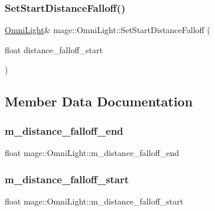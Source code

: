 \hypertarget{classmage_1_1_omni_light_a3d8adcbc2e6c712eae738ddfd47454f6}{}\label{classmage_1_1_omni_light_a3d8adcbc2e6c712eae738ddfd47454f6} 
\subsubsection{\texorpdfstring{Set\+Start\+Distance\+Falloff()}{SetStartDistanceFalloff()}}
{\footnotesize\ttfamily \hyperlink{classmage_1_1_omni_light}{Omni\+Light}\& mage\+::\+Omni\+Light\+::\+Set\+Start\+Distance\+Falloff (\begin{DoxyParamCaption}\item[{float}]{distance\+\_\+falloff\+\_\+start }\end{DoxyParamCaption})}



\subsection{Member Data Documentation}
\hypertarget{classmage_1_1_omni_light_a4ee5cc4103305dc96b43d6286858ef74}{}\label{classmage_1_1_omni_light_a4ee5cc4103305dc96b43d6286858ef74} 
\subsubsection{\texorpdfstring{m\+\_\+distance\+\_\+falloff\+\_\+end}{m\_distance\_falloff\_end}}
{\footnotesize\ttfamily float mage\+::\+Omni\+Light\+::m\+\_\+distance\+\_\+falloff\+\_\+end\hspace{0.3cm}{\ttfamily [private]}}

\hypertarget{classmage_1_1_omni_light_ab784744d39ad3d4f4a7b2214a55108f7}{}\label{classmage_1_1_omni_light_ab784744d39ad3d4f4a7b2214a55108f7} 
\subsubsection{\texorpdfstring{m\+\_\+distance\+\_\+falloff\+\_\+start}{m\_distance\_falloff\_start}}
{\footnotesize\ttfamily float mage\+::\+Omni\+Light\+::m\+\_\+distance\+\_\+falloff\+\_\+start\hspace{0.3cm}{\ttfamily [private]}}

